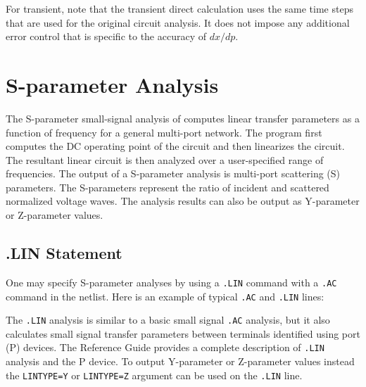 For transient, note that the transient direct calculation uses the same time steps 
that are used for the original circuit analysis.  It does not impose any additional error
control that is specific to the accuracy of $dx/dp$.


\section{S-parameter Analysis}
\label{SP_Analysis}
\label{SP_Sweep_Overview}
  
 

The S-parameter small-signal analysis of \Xyce{} computes linear transfer parameters as a
function of frequency for a general multi-port network. The program first computes the DC operating point of 
the circuit and then linearizes the circuit. The resultant linear circuit is then
analyzed over a user-specified range of frequencies. The output of a S-parameter
analysis is multi-port scattering (S) parameters. The S-parameters represent
the ratio of incident and scattered normalized voltage waves.  The analysis
results can also be output as Y-parameter or Z-parameter values.

\subsection{.LIN Statement}

One may specify S-parameter analyses by using a \verb|.LIN| command with a \verb|.AC| command in the netlist.
Here is an example of typical \verb|.AC| and \verb|.LIN| lines:


The \verb|.LIN| analysis is similar to a basic small signal \verb|.AC| analysis, but it also calculates small signal 
transfer parameters between terminals identified using port (P) devices. The \Xyce{} Reference Guide\ReferenceGuide{} 
provides a complete description of \verb|.LIN| analysis and the P device.  To output Y-parameter
or Z-parameter values instead the \texttt{LINTYPE=Y} or \texttt{LINTYPE=Z} argument can be
used on the \texttt{.LIN} line.

